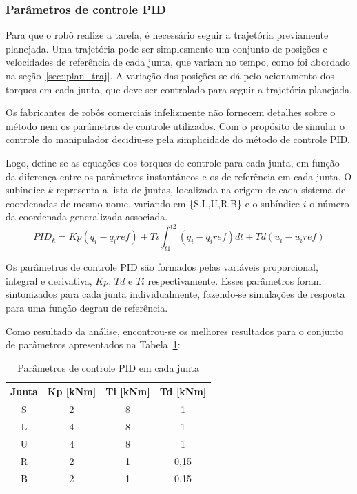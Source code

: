 \subsubsection{Parâmetros de controle PID}

Para que o robô realize a tarefa, é necessário seguir a trajetória previamente
planejada. Uma trajetória pode ser simplesmente um conjunto de posições e
velocidades de referência de cada junta, que variam no tempo, como foi abordado
na seção~\ref{sec::plan_traj}. A variação das posições se dá pelo acionamento
dos torques em cada junta, que deve ser controlado para seguir a trajetória
planejada.

Os fabricantes de robôs comerciais infelizmente não fornecem detalhes sobre o
método nem os parâmetros de controle utilizados.
Com o propósito de simular o controle do manipulador decidiu-se pela
simplicidade do método de controle PID.

Logo, define-se as equações dos torques de controle para cada junta, em função
da diferença entre os parâmetros instantâneos e os de referência em cada junta.
O subíndice $k$ representa a lista de juntas, localizada na origem de cada
sistema de coordenadas de mesmo nome, variando em \{S,L,U,R,B\} e o
subíndice $i$ o número da coordenada generalizada associada.
%
\begin{equation}
	PID_{k} = Kp(q_i-q_i{ref}) + Ti\int_{t1}^{t2} (q_i-q_i{ref})dt +
	Td(u_i-u_i{ref}) \label{eq::pid}
\end{equation}
%

Os parâmetros de controle PID são formados pelas variáveis proporcional,
integral e derivativa, $Kp$, $Td$ e $Ti$ respectivamente. Esses parâmetros
foram sintonizados para cada junta individualmente, fazendo-se simulações de
resposta para uma função degrau de referência. 

Como resultado da análise, encontrou-se os melhores resultados para o conjunto
de parâmetros apresentados na Tabela~\ref{tab::pid}:
%
\begin{table}[h]
\centering
\caption{Parâmetros de controle PID em cada junta}
\label{tab::pid}
\begin{tabular}{@{}cccc@{}}
\toprule
\textbf{Junta} & \textbf{Kp [kNm]} & \textbf{Ti [kNm]} & \textbf{Td [kNm]} \\ \midrule 
S              & 2		& 8		& 1		\\
L              & 4		& 8		& 1		\\
U              & 4		& 8		& 1		\\
R              & 2		& 1		& 0,15	\\
B              & 2		& 1		& 0,15	\\ \bottomrule
\end{tabular}
\end{table}
%

